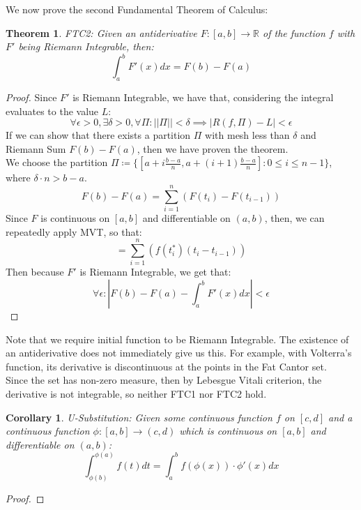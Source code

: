 \documentclass[10pt,letterpaper]{article} %
\newtheorem{thm}{Theorem}[section]
\newtheorem{cor}{Corollary}[section]
\begin{document}
We now prove the second Fundamental Theorem of Calculus:
\begin{thm}
FTC2: Given an antiderivative $F: [a, b] \xrightarrow{} \mathbb{R}$ of the function $f$ with $F'$ being Riemann Integrable, then:
\begin{equation*}
  \int_{a}^{b} F'(x)dx = F(b) - F(a)
\end{equation*}
\end{thm}
\begin{proof}
Since $F'$ is Riemann Integrable, we have that, considering the integral evaluates to the value $L$:
\begin{equation*}
  \forall \epsilon > 0, \exists \delta > 0, \forall \Pi: ||\Pi|| < \delta \implies |R(f, \Pi) - L| < \epsilon
\end{equation*}
If we can show that there exists a partition $\Pi$ with mesh less than $\delta$ and Riemann Sum $F(b) - F(a)$, then we have proven the theorem.\\

We choose the partition $\Pi \coloneq \{[a + i \frac{b-a}{n}, a + (i+1)\frac{b-a}{n}]: 0 \leqslant i \leqslant n-1\}$, where $\delta \cdot n > b-a$. 
\begin{equation*}
  F(b) - F(a) = \sum_{i=1}^{n}(F(t_i) - F(t_{i-1}))
\end{equation*}
Since $F$ is continuous on $[a, b]$ and differentiable on $(a, b)$, then, we can repeatedly apply MVT, so that:
\begin{equation*}
  = \sum_{i=1}^{n}(f(t_i^*)(t_i - t_{i-1}))
\end{equation*}
Then because $F'$ is Riemann Integrable, we get that:
\begin{equation*}
  \forall \epsilon: \left|F(b) - F(a) - \int_{a}^{b} F'(x)dx\right| < \epsilon
\end{equation*}
\end{proof}
Note that we require initial function to be Riemann Integrable. The existence of an antiderivative does not immediately give us this. For example, with Volterra's function, its derivative is discontinuous at the points in the Fat Cantor set.\\

Since the set has non-zero measure, then by Lebesgue Vitali criterion, the derivative is not integrable, so neither FTC1 nor FTC2 hold. 

\begin{cor}
U-Substitution: Given some continuous function $f$ on $[c, d]$ and a continuous function $\phi: [a, b] \xrightarrow{} (c, d)$ which is continuous on $[a, b]$ and differentiable on $(a, b)$:
\begin{equation*}
  \int_{\phi(b)}^{\phi(a)} f(t) dt = \int_{a}^{b}f(\phi(x)) \cdot \phi'(x) dx
\end{equation*}
\end{cor}
\begin{proof}
  
\end{proof}
\end{document}
